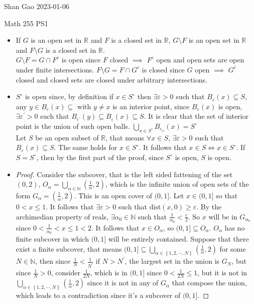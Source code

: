 \documentclass[12pt]{article}
\newcommand{\RR}{\mathbb{R}}
\newcommand{\NN}{\mathbb{N}}
\newcommand\set[1]{\left\lbrace #1 \right\rbrace}
\newcommand\parens[1]{\left( #1 \right)}
\newcommand\dist[1]{\text{dist}(#1 )}
\begin{document}
    


    \noindent Shan Gao \hfill  2023-01-06
    
    \begin{center}
      {\large Math 255 PS1 }
    \end{center}

    \begin{itemize}
        \item[1.] If $G$ is an open set in $\RR$ and $F$ is a closed set in $\RR$, $G \setminus F$ is an open set in $\RR$ and $F\setminus G$ is a closed set in $\RR$. \\
        $G\setminus F = G\cap F^c$ is open since $F$ closed $\implies$ $F^c$ open and open sets are open under finite intersections. $F \setminus G = F \cap G^c $ is closed since $G$ open $\implies$ $G^c$ closed and closed sets are closed under arbitrary intersections. 
        \item[2.]  $S^\circ$ is open since, by definition if $x \in S^\circ$ then $\exists \varepsilon > 0 $ such that $B_\varepsilon(x) \subseteq S$, any $y \in B_\varepsilon(x) \subseteq $ with $y \neq x$ is an interior point, since $B_\varepsilon(x)$ is open, $\exists \varepsilon^\prime > 0 $ such that $B_{\varepsilon^\prime} (y) \subseteq B_\varepsilon(x) \subseteq S$. It is clear that the set of interior point is the union of such open balls. $\displaystyle \bigcup_{x \in S^\circ} B_{\varepsilon_x} (x) = S^\circ$\\
        Let $S$ be an open subset of $\RR$, that means $\forall x \in S$, $\exists \varepsilon > 0$ such that $B_\varepsilon(x) \subseteq S$. The same holds for $x \in S^\circ$. It follows that $x \in S \iff x \in S^\circ$. If $S = S^\circ$, then by the first part of the proof, since $S^\circ$ is open, $S$ is open. 
        \item[3.]
       \begin{proof}
        Consider the subcover, that is the left sided fattening of the set $(0,2)$,  $ O_\alpha =\bigcup_{\alpha \in \NN} \parens{\frac{1}{\alpha}, 2}$, which is the infinite union of open sets of the form $G_\alpha = \parens{\frac{1}{\alpha}, 2}$. This is an open cover of $(0,1]$. Let $x \in (0,1]$ so that $0 < x \leq 1$. It follows that $\exists \varepsilon > 0$ such that $\dist{x,0} \geq \varepsilon$. By the archimedian property of reals, $\exists \alpha_0 \in \NN$ such that  $\frac{1}{\alpha_0} < \frac{\varepsilon}{2}$. So $x$ will be in $G_{\alpha_0}$ since $0 < \frac{1}{\alpha_0} < x \leq 1 < 2$. It follows that $x \in O_\alpha$, so $(0,1] \subseteq O_\alpha$. $O_\alpha$ has no finite subcover in which $(0,1]$ will be entirely contained. Suppose that there exist a finite subcover, that means $(0,1] \subseteq \bigcup_{\alpha \in \set{1,2,\cdots,N}} \parens{\frac{1}{\alpha}, 2}$ for some $N \in \NN$, then since $\frac{1}{N} < \frac{1}{N^\prime}$ if $N > N^\prime$, the largest set in the union is $G_N$, but since $\frac{1}{N} >  0$, consider $\frac{1}{2N}$, which is in $(0,1]$ since $0< \frac{1}{2N} \leq 1$, but it is not in $\bigcup_{\alpha \in \set{1,2,\cdots,N}} \parens{\frac{1}{\alpha}, 2}$ since it is not in any of $G_\alpha$ that compose the union, which leads to a contradiction since it's a subcover of $(0,1]$. 

\end{proof}
\end{itemize}
\end{document}
